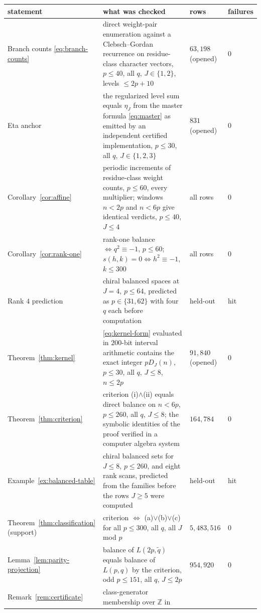 \documentclass[11pt]{article}
\theoremstyle{definition}
\newcommand{\Z}{\mathbb Z}
\begin{document}
\begin{small}
\begin{longtable}{@{}L{0.24\textwidth}L{0.41\textwidth}L{0.2\textwidth}L{0.07\textwidth}@{}}
\toprule
statement & what was checked & rows & failures\\
\midrule
\endhead
Branch counts \eqref{eq:branch-counts} & direct weight-pair enumeration
against a Clebsch--Gordan recurrence on residue-class character vectors,
$p\leq40$, all $q$, $J\in\{1,2\}$, levels $\leq2p+10$ & $63{,}198$
(opened) & $0$\\
Eta anchor & the regularized level sum equals $\eta_J$ from the master
formula \eqref{eq:master} as emitted by an independent certified
implementation, $p\leq30$, all $q$, $J\in\{1,2,3\}$ & $831$ (opened) & $0$\\
Corollary~\ref{cor:affine} & periodic increments of residue-class weight
counts, $p\leq60$, every multiplier; windows $n<2p$ and $n<6p$ give
identical verdicts, $p\leq40$, $J\leq4$ & all rows & $0$\\
Corollary~\ref{cor:rank-one} & rank-one balance $\iff q^2\equiv-1$,
$p\leq60$; $s(h,k)=0\iff h^2\equiv-1$, $k\leq300$ & all rows & $0$\\
Rank $4$ prediction & chiral balanced spaces at $J=4$, $p\leq64$, predicted
as $p\in\{31,62\}$ with four $q$ each before computation & held-out & hit\\
Theorem~\ref{thm:kernel} & \eqref{eq:kernel-form} evaluated in $200$-bit
interval arithmetic contains the exact integer $pD_J(n)$, $p\leq30$, all
$q$, $J\leq8$, $n\leq2p$ & $91{,}840$ (opened) & $0$\\
Theorem~\ref{thm:criterion} & criterion (i)$\wedge$(ii) equals direct
balance on $n<6p$, $p\leq260$, all $q$, $J\leq8$; the symbolic identities
of the proof verified in a computer algebra system & $164{,}784$ & $0$\\
Example~\ref{ex:balanced-table} & chiral balanced sets for $J\leq8$,
$p\leq260$, and eight rank scans, predicted from the families before the
rows $J\geq5$ were computed & held-out & hit\\
Theorem~\ref{thm:classification} (support) & criterion $\iff$ (a)$\vee$(b)$\vee$(c)
for all $p\leq300$, all $q$, all $J$ mod $p$ & $5{,}483{,}516$ & $0$\\
Lemma~\ref{lem:parity-projection} & balance of $L(2p,\tilde q)$ equals
balance of $L(p,q)$ by the criterion, odd $p\leq151$, all $q$, $J\leq2p$
& $954{,}920$ & $0$\\
Remark~\ref{rem:certificate} & class-generator membership over $\Z$ in

\end{longtable}
\end{small}
\end{document}

